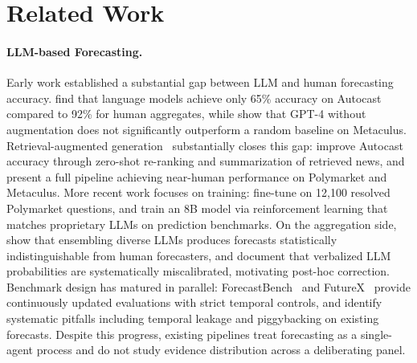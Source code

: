 \section{Related Work}
\label{sec:related}

\paragraph{LLM-based Forecasting.}
Early work established a substantial gap between LLM and human forecasting accuracy.
\citet{zou2022forecasting} find that language models achieve only 65\% accuracy on Autocast compared to 92\% for human aggregates, while \citet{schoenegger2023large} show that GPT-4 without augmentation does not significantly outperform a random baseline on Metaculus.
Retrieval-augmented generation~\citep{lewis2020retrieval} substantially closes this gap: \citet{yanautocast++} improve Autocast accuracy through zero-shot re-ranking and summarization of retrieved news, and \citet{halawi2024approaching} present a full pipeline achieving near-human performance on Polymarket and Metaculus.
More recent work focuses on training: \citet{turtel2025llms} fine-tune on 12,100 resolved Polymarket questions, and \citet{chandakscaling} train an 8B model via reinforcement learning that matches proprietary LLMs on prediction benchmarks.
On the aggregation side, \citet{schoenegger2024wisdom} show that ensembling diverse LLMs produces forecasts statistically indistinguishable from human forecasters, and \citet{tian2023just} document that verbalized LLM probabilities are systematically miscalibrated, motivating post-hoc correction.
Benchmark design has matured in parallel: ForecastBench~\citep{karger2024forecastbench} and FutureX~\citep{zeng2025futurex} provide continuously updated evaluations with strict temporal controls, and \citet{paleka2025pitfalls} identify systematic pitfalls including temporal leakage and piggybacking on existing forecasts.
Despite this progress, existing pipelines treat forecasting as a single-agent process and do not study evidence distribution across a deliberating panel.

